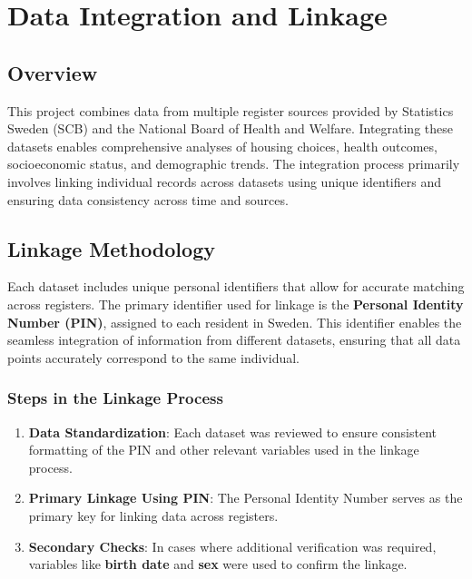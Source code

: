 \documentclass[
]{book}
\providecommand{\tightlist}{%
  \setlength{\itemsep}{0pt}\setlength{\parskip}{0pt}}
\begin{document}
\hypertarget{data-integration-and-linkage}{%
\chapter{Data Integration and Linkage}\label{data-integration-and-linkage}}

\hypertarget{overview-1}{%
\section{Overview}\label{overview-1}}

This project combines data from multiple register sources provided by Statistics Sweden (SCB) and the National Board of Health and Welfare. Integrating these datasets enables comprehensive analyses of housing choices, health outcomes, socioeconomic status, and demographic trends. The integration process primarily involves linking individual records across datasets using unique identifiers and ensuring data consistency across time and sources.

\hypertarget{linkage-methodology}{%
\section{Linkage Methodology}\label{linkage-methodology}}

Each dataset includes unique personal identifiers that allow for accurate matching across registers. The primary identifier used for linkage is the \textbf{Personal Identity Number (PIN)}, assigned to each resident in Sweden. This identifier enables the seamless integration of information from different datasets, ensuring that all data points accurately correspond to the same individual.

\hypertarget{steps-in-the-linkage-process}{%
\subsection{Steps in the Linkage Process}\label{steps-in-the-linkage-process}}

\begin{enumerate}
\def\labelenumi{\arabic{enumi}.}
\tightlist
\item
  \textbf{Data Standardization}: Each dataset was reviewed to ensure consistent formatting of the PIN and other relevant variables used in the linkage process.
\item
  \textbf{Primary Linkage Using PIN}: The Personal Identity Number serves as the primary key for linking data across registers.
\item
  \textbf{Secondary Checks}: In cases where additional verification was required, variables like \textbf{birth date} and \textbf{sex} were used to confirm the linkage.
\end{enumerate}
\end{document}
